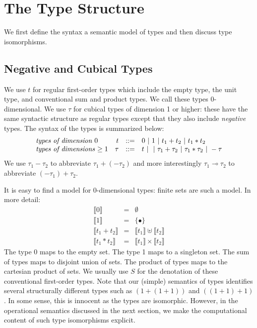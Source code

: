 \documentclass[authoryear,preprint]{sigplanconf}
\newcommand{\lolli}{\multimap}
\newcommand{\den}[1]{\llbracket #1 \rrbracket}
\begin{document}
\section{The Type Structure}

We first define the syntax a semantic model of types and then discuss type
isomorphisms.

\subsection{Negative and Cubical Types}

We use $t$ for regular first-order types which include the empty type, the
unit type, and conventional sum and product types. We call these types
$0$-dimensional. We use $\tau$ for cubical types of dimension 1 or higher:
these have the same syntactic structure as regular types except that they
also include \emph{negative} types. The syntax of the types is summarized
below:
\[\begin{array}{lrcl}
\textit{types of dimension $0$} & 
  t &::=& 0 ~|~ 1 ~|~ t_1 + t_2 ~|~ t_1 * t_2 \\
\textit{types of dimensions $\geq 1$} & 
  \tau &::=& t ~|~ ~|~ \tau_1 + \tau_2 ~|~ \tau_1 * \tau_2 ~|~ - \tau
\end{array}\]
We use $\tau_1 - \tau_2$ to abbreviate $\tau_1 + (- \tau_2)$ and more
interestingly $\tau_1 \lolli \tau_2$ to abbreviate $(- \tau_1) + \tau_2$. 

It is easy to find a model for $0$-dimensional types: finite sets are such a
model. In more detail:
\[\begin{array}{rcl}
\den{0} &=& \emptyset \\
\den{1} &=& \{ \bullet \} \\
\den{t_1 + t_2} &=& \den{t_1} \uplus \den{t_2} \\
\den{t_1 * t_2} &=& \den{t_1} \times \den{t_2} 
\end{array}\]
The type 0 maps to the empty set. The type 1 maps to a singleton set. The sum
of types maps to disjoint union of sets. The product of types maps to the
cartesian product of sets. We usually use $S$ for the denotation of these
conventional first-order types. Note that our (simple) semantics of types
identifies several structurally different types such as $(1+(1+1))$ and
$((1+1)+1)$. In some sense, this is innocent as the types are
isomorphic. However, in the operational semantics discussed in the next
section, we make the computational content of such type isomorphisms
explicit.
\end{document}
